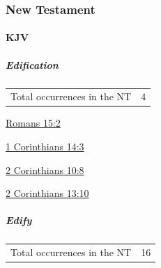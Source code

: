 		
		
	\subsubsection{New Testament} %
		\label{EDIFICATION-NT}
	
		\paragraph{KJV}
			\label{EDIFICATION-NT-KJV}		
			
			\subparagraph{Edification}
	
				\begin{tabular}{ll}
					Total occurrences in the NT & 4
				\end{tabular}
				
				\begin{compactdesc}
					\item[{\hyperref[ROMANS-15-2]{Romans 15:2}}]
					\item[{\hyperref[1CORINTHIANS-14-3]{1 Corinthians 14:3}}]
					\item[{\hyperref[2CORINTHIANS-10-8]{2 Corinthians 10:8}}]
					\item[{\hyperref[2CORINTHIANS-13-10]{2 Corinthians 13:10}}]
				\end{compactdesc}
				
			\subparagraph{Edify}
	
				\begin{tabular}{ll}
					Total occurrences in the NT & 16
				\end{tabular}
				
